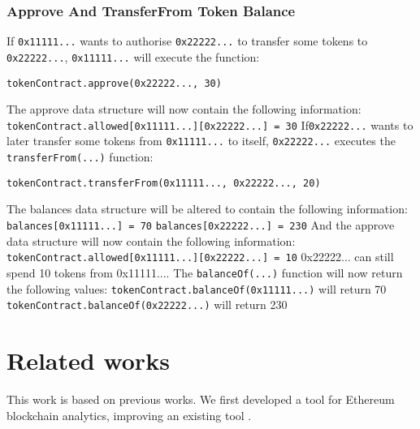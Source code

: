 \subsubsection{Approve And TransferFrom Token Balance}
If \texttt{0x11111...} wants to authorise \texttt{0x22222...} to transfer some tokens to \texttt{0x22222...}, \texttt{0x11111...} will execute the function:
\begin{lstlisting}[language=Solidity]
    tokenContract.approve(0x22222..., 30)
\end{lstlisting}
The approve data structure will now contain the following information:
\newline
\hspace*{4ex} \texttt{tokenContract.allowed[0x11111...][0x22222...] = 30}
\newline
If\texttt{0x22222...} wants to later transfer some tokens from \texttt{0x11111...} to itself, \texttt{0x22222...} executes the \texttt{transferFrom(...)} function:
\begin{lstlisting}[language=Solidity]
    tokenContract.transferFrom(0x11111..., 0x22222..., 20)
\end{lstlisting}
The balances data structure will be altered to contain the following information:
\newline
\hspace*{4ex} \texttt{balances[0x11111...] = 70}
\newline
\hspace*{4ex} \texttt{balances[0x22222...] = 230}
\newline
And the approve data structure will now contain the following information:
\newline
\hspace*{4ex} \texttt{tokenContract.allowed[0x11111...][0x22222...] = 10}
\newline
0x22222... can still spend 10 tokens from 0x11111....
The \texttt{balanceOf(...)} function will now return the following values:
\newline
\hspace*{4ex} \texttt{tokenContract.balanceOf(0x11111...)} will return 70
\newline
\hspace*{4ex} \texttt{tokenContract.balanceOf(0x22222...)} will return 230


\section{Related works}
This work is based on previous works. We first developed a tool for Ethereum blockchain analytics, improving an existing tool \cite{bartoletti2017generalbit,bartoletti2017generalblock}.

